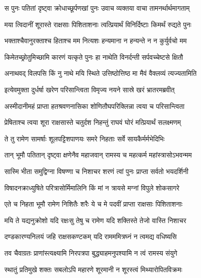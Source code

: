 
\twolineshloka
{स पुनः पतितां दृष्ट्वा क्रोधाच्छूर्पणखां पुनः}
{उवाच व्यक्तया वाचा तामनर्थार्थमागताम्} %

\twolineshloka
{मया त्विदानीं शूरास्ते राक्षसाः पिशिताशनाः}
{त्वत्प्रियार्थं विनिर्दिष्टाः किमर्थं रुद्यते पुनः} %

\twolineshloka
{भक्ताश्चैवानुरक्ताश्च हिताश्च मम नित्यशः}
{हन्यमाना न हन्यन्ते न न कुर्युर्वचो मम} %

\twolineshloka
{किमेतच्छ्रोतुमिच्छामि कारणं यत्कृते पुनः}
{हा नाथेति विनर्दन्ती सर्पवच्चेष्टसे क्षितौ} %

\twolineshloka
{अनाथवद् विलपसि किं नु नाथे मयि स्थिते}
{उत्तिष्ठोत्तिष्ठ मा मैवं वैक्लव्यं त्यज्यतामिति} %

\twolineshloka
{इत्येवमुक्ता दुर्धर्षा खरेण परिसान्त्विता}
{विमृज्य नयने सास्रे खरं भ्रातरमब्रवीत्} %

\twolineshloka
{अस्मीदानीमहं प्राप्ता हतश्रवणनासिका}
{शोणितौघपरिक्लिन्ना त्वया च परिसान्त्विता} %

\twolineshloka
{प्रेषिताश्च त्वया शूरा राक्षसास्ते चतुर्दश}
{निहन्तुं राघवं घोरं मत्प्रियार्थं सलक्ष्मणम्} %

\twolineshloka
{ते तु रामेण सामर्षाः शूलपट्टिशपाणयः}
{समरे निहताः सर्वे सायकैर्मर्मभेदिभिः} %

\twolineshloka
{तान् भूमौ पतितान् दृष्ट्वा क्षणेनैव महाजवान्}
{रामस्य च महत्कर्म महांस्त्रासोऽभवन्मम} %

\twolineshloka
{सास्मि भीता समुद्विग्ना विषण्णा च निशाचर}
{शरणं त्वां पुनः प्राप्ता सर्वतो भयदर्शिनी} %

\twolineshloka
{विषादनक्राध्युषिते परित्रासोर्मिमालिनि}
{किं मां न त्रायसे मग्नां विपुले शोकसागरे} %

\twolineshloka
{एते च निहता भूमौ रामेण निशितैः शरैः}
{ये च मे पदवीं प्राप्ता राक्षसाः पिशिताशनाः} %

\twolineshloka
{मयि ते यद्यनुक्रोशो यदि रक्षःसु तेषु च}
{रामेण यदि शक्तिस्ते तेजो वास्ति निशाचर} %

\twolineshloka
{दण्डकारण्यनिलयं जहि राक्षसकण्टकम्}
{यदि रामममित्रघ्नं न त्वमद्य वधिष्यसि} %

\twolineshloka
{तव चैवाग्रतः प्राणांस्त्यक्ष्यामि निरपत्रपा}
{बुद्ध्याहमनुपश्यामि न त्वं रामस्य संयुगे} %

\twolineshloka
{स्थातुं प्रतिमुखे शक्तः सबलोऽपि महारणे}
{शूरमानी न शूरस्त्वं मिथ्यारोपितविक्रमः} %

